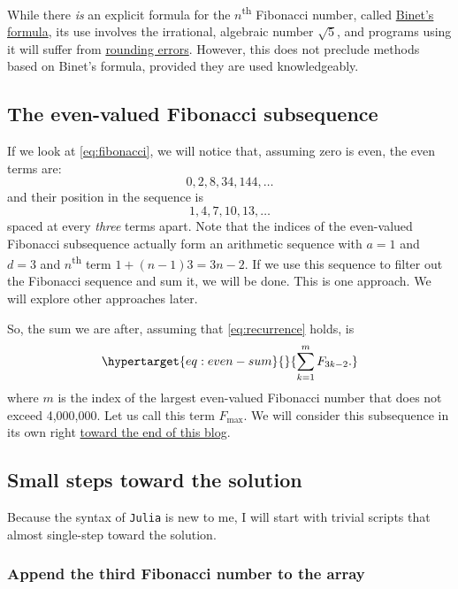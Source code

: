 \documentclass[
  a4paper,
]{article}
\begin{document}
While there \emph{is} an explicit formula for the
\(n\)\textsuperscript{th} Fibonacci number, called
\href{https://artofproblemsolving.com/wiki/index.php/Binet\%27s_Formula}{Binet's
formula}, its use involves the irrational, algebraic number \(\sqrt5\),
and programs using it will suffer from
\href{https://www.cs.drexel.edu/~popyack/Courses/CSP/Fa17/extras/Rounding/index.html}{rounding
errors}. However, this does not preclude methods based on Binet's
formula, provided they are used knowledgeably.

\hypertarget{the-even-valued-fibonacci-subsequence}{%
\subsection{The even-valued Fibonacci
subsequence}\label{the-even-valued-fibonacci-subsequence}}

If we look at \cref{eq:fibonacci}, we will notice that, assuming zero is
even, the even terms are: \[
0, 2, 8, 34, 144, \ldots
\] and their position in the sequence is \[
1, 4, 7, 10, 13, \ldots
\] spaced at every \emph{three} terms apart. Note that the indices of
the even-valued Fibonacci subsequence actually form an arithmetic
sequence with \(a = 1\) and \(d = 3\) and \(n\)\textsuperscript{th} term
\(1 + (n - 1)3 = 3n - 2\). If we use this sequence to filter out the
Fibonacci sequence and sum it, we will be done. This is one approach. We
will explore other approaches later.

So, the sum we are after, assuming that \cref{eq:recurrence} holds, is
\begin{equation}\protect\hypertarget{eq:even-sum}{}{
\sum_{k=1}^{m}F_{3k-2}.
}\label{eq:even-sum}\end{equation} where \(m\) is the index of the
largest even-valued Fibonacci number that does not exceed 4,000,000. Let
us call this term \(F_{\max}\). We will consider this subsequence in its
own right \protect\hyperlink{a-second-look-at-the-problem}{toward the
end of this blog}.

\hypertarget{small-steps-toward-the-solution}{%
\subsection{Small steps toward the
solution}\label{small-steps-toward-the-solution}}

Because the syntax of \texttt{Julia} is new to me, I will start with
trivial scripts that almost single-step toward the solution.

\hypertarget{append-the-third-fibonacci-number-to-the-array}{%
\subsubsection{Append the third Fibonacci number to the
array}\label{append-the-third-fibonacci-number-to-the-array}}
\end{document}
